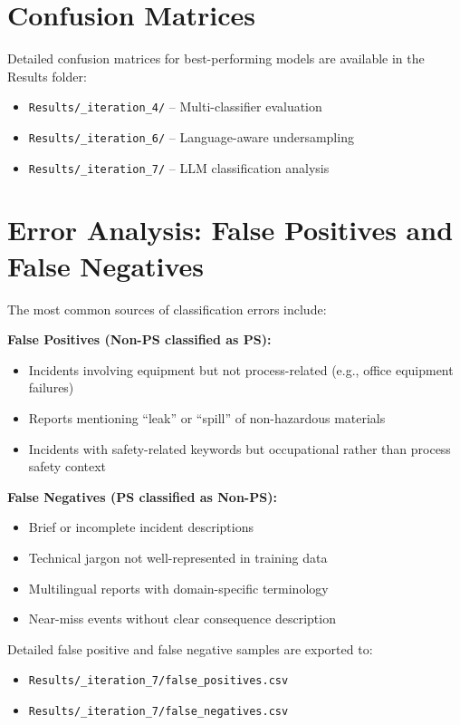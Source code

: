 \documentclass[11pt, titlepage, bibliography=totoc]{scrreprt}
\begin{document}
\section{Confusion Matrices}

Detailed confusion matrices for best-performing models are available in the Results folder:
\begin{itemize}
    \item \texttt{Results/\_iteration\_4/} -- Multi-classifier evaluation
    \item \texttt{Results/\_iteration\_6/} -- Language-aware undersampling
    \item \texttt{Results/\_iteration\_7/} -- LLM classification analysis
\end{itemize}

\section{Error Analysis: False Positives and False Negatives}

The most common sources of classification errors include:

\textbf{False Positives (Non-PS classified as PS):}
\begin{itemize}
    \item Incidents involving equipment but not process-related (e.g., office equipment failures)
    \item Reports mentioning ``leak'' or ``spill'' of non-hazardous materials
    \item Incidents with safety-related keywords but occupational rather than process safety context
\end{itemize}

\textbf{False Negatives (PS classified as Non-PS):}
\begin{itemize}
    \item Brief or incomplete incident descriptions
    \item Technical jargon not well-represented in training data
    \item Multilingual reports with domain-specific terminology
    \item Near-miss events without clear consequence description
\end{itemize}

Detailed false positive and false negative samples are exported to:
\begin{itemize}
    \item \texttt{Results/\_iteration\_7/false\_positives.csv}
    \item \texttt{Results/\_iteration\_7/false\_negatives.csv}
\end{itemize}
\end{document}
